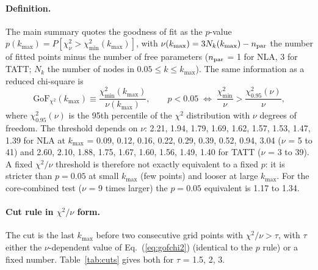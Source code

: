 \documentclass[11pt]{article}
\newcommand{\kmax}{k_{\max}}
\begin{document}
\paragraph{Definition.} The main summary quotes the goodness of fit as the
$p$-value $p(\kmax) = P[\chi^2_\nu > \chi^2_{\min}(\kmax)]$, with
$\nu(\kmax) = 3N_k(\kmax) - n_{\rm par}$ the number of fitted points minus the
number of free parameters ($n_{\rm par}$ = 1 for NLA, 3 for TATT; $N_k$ the
number of nodes in $0.05 \le k \le \kmax$). The same information as a reduced
chi-square is
\begin{equation}
  \mathrm{GoF}_{\chi^2}(\kmax) \equiv \frac{\chi^2_{\min}(\kmax)}{\nu(\kmax)},
  \qquad
  p < 0.05 \;\Leftrightarrow\; \frac{\chi^2_{\min}}{\nu} > \frac{\chi^2_{0.95}(\nu)}{\nu},
  \label{eq:gofchi2}
\end{equation}
where $\chi^2_{0.95}(\nu)$ is the 95th percentile of the $\chi^2$
distribution with $\nu$ degrees of freedom. The threshold depends on $\nu$:
2.21, 1.94, 1.79, 1.69, 1.62, 1.57, 1.53, 1.47, 1.39 for NLA at $\kmax$ =
0.09, 0.12, 0.16, 0.22, 0.29, 0.39, 0.52, 0.94, 3.04 ($\nu$ = 5 to 41) and
2.60, 2.10, 1.88, 1.75, 1.67, 1.60, 1.56, 1.49, 1.40 for TATT ($\nu$ = 3 to
39). A fixed $\chi^2/\nu$ threshold is therefore not exactly equivalent to a
fixed $p$: it is stricter than $p = 0.05$ at small $\kmax$ (few points) and
looser at large $\kmax$. For the core-combined test ($\nu$ = 9 times larger)
the $p = 0.05$ equivalent is 1.17 to 1.34.

\paragraph{Cut rule in $\chi^2/\nu$ form.} The cut is the last $\kmax$ before
two consecutive grid points with $\chi^2/\nu > \tau$, with $\tau$ either the
$\nu$-dependent value of Eq.~(\ref{eq:gofchi2}) (identical to the $p$ rule)
or a fixed number. Table~\ref{tab:cuts} gives both for $\tau$ = 1.5, 2, 3.
\end{document}

